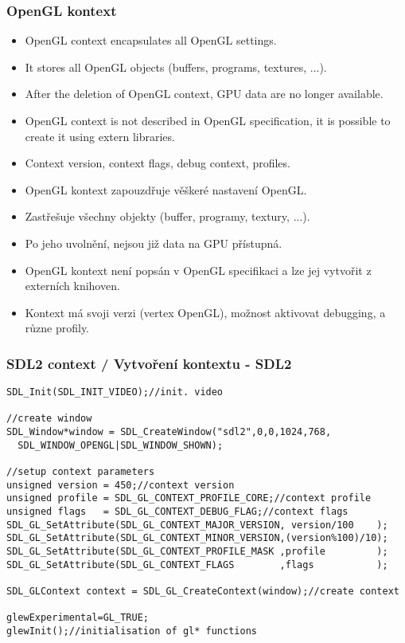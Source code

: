 \begin{frame}[fragile]\frametitle{OpenGL kontext}\scriptsize
  \begin{itemize}
    \item OpenGL context encapsulates all OpenGL settings.
    \item It stores all OpenGL objects (buffers, programs, textures, ...).
    \item After the deletion of OpenGL context, GPU data are no longer available.
    \item OpenGL context is not described in OpenGL specification, it is possible to create it using extern libraries.
    \item Context version, context flags, debug context, profiles.
  \end{itemize}
  \begin{itemize}
    \item OpenGL kontext zapouzdřuje věškeré nastavení OpenGL.
    \item Zastřešuje všechny objekty (buffer, programy, textury, ...).
    \item Po jeho uvolnění, nejsou již data na GPU přístupná.
    \item OpenGL kontext není popsán v OpenGL specifikaci a lze jej vytvořit z externích knihoven.
    \item Kontext má svoji verzi (vertex OpenGL), možnost aktivovat debugging, a různe profily.
  \end{itemize}
\end{frame}

\begin{frame}[fragile]\frametitle{SDL2 context / Vytvoření kontextu - SDL2}\scriptsize
\begin{verbatim}
SDL_Init(SDL_INIT_VIDEO);//init. video

//create window
SDL_Window*window = SDL_CreateWindow("sdl2",0,0,1024,768,
  SDL_WINDOW_OPENGL|SDL_WINDOW_SHOWN);

//setup context parameters
unsigned version = 450;//context version
unsigned profile = SDL_GL_CONTEXT_PROFILE_CORE;//context profile
unsigned flags   = SDL_GL_CONTEXT_DEBUG_FLAG;//context flags
SDL_GL_SetAttribute(SDL_GL_CONTEXT_MAJOR_VERSION, version/100    );
SDL_GL_SetAttribute(SDL_GL_CONTEXT_MINOR_VERSION,(version%100)/10);
SDL_GL_SetAttribute(SDL_GL_CONTEXT_PROFILE_MASK ,profile         );
SDL_GL_SetAttribute(SDL_GL_CONTEXT_FLAGS        ,flags           );

SDL_GLContext context = SDL_GL_CreateContext(window);//create context

glewExperimental=GL_TRUE;
glewInit();//initialisation of gl* functions
\end{verbatim}
\end{frame}


